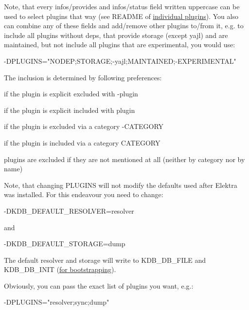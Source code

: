 Note, that every {\ttfamily infos/provides} and {\ttfamily infos/status} field written uppercase can be used to select plugins that way (see R\+E\+A\+D\+ME of \hyperlink{md_src_plugins_README_src_plugins_README_md}{individual plugins}). You also can combine any of these fields and add/remove other plugins to/from it, e.\+g. to include all plugins without deps, that provide storage (except {\ttfamily yajl}) and are maintained, but not include all plugins that are experimental, you would use\+: \begin{DoxyVerb}-DPLUGINS="NODEP;STORAGE;-yajl;MAINTAINED;-EXPERIMENTAL"
\end{DoxyVerb}


The inclusion is determined by following preferences\+:


\begin{DoxyEnumerate}
\item if the plugin is explicit excluded with {\ttfamily -\/plugin}
\item if the plugin is explicit included with {\ttfamily plugin}
\item if the plugin is excluded via a category {\ttfamily -\/\+C\+A\+T\+E\+G\+O\+RY}
\item if the plugin is included via a category {\ttfamily C\+A\+T\+E\+G\+O\+RY}
\item plugins are excluded if they are not mentioned at all (neither by category nor by name)
\end{DoxyEnumerate}

Note, that changing {\ttfamily P\+L\+U\+G\+I\+NS} will not modify the defaults used after Elektra was installed. For this endeavour you need to change\+: \begin{DoxyVerb}-DKDB_DEFAULT_RESOLVER=resolver
\end{DoxyVerb}


and \begin{DoxyVerb}-DKDB_DEFAULT_STORAGE=dump
\end{DoxyVerb}


The default resolver and storage will write to {\ttfamily K\+D\+B\+\_\+\+D\+B\+\_\+\+F\+I\+LE} and {\ttfamily K\+D\+B\+\_\+\+D\+B\+\_\+\+I\+N\+IT} (\hyperlink{md_doc_help_elektra-bootstrapping_doc_help_elektra-bootstrapping_md}{for bootstrapping}).

Obviously, you can pass the exact list of plugins you want, e.\+g.\+: \begin{DoxyVerb}-DPLUGINS="resolver;sync;dump"
\end{DoxyVerb}


